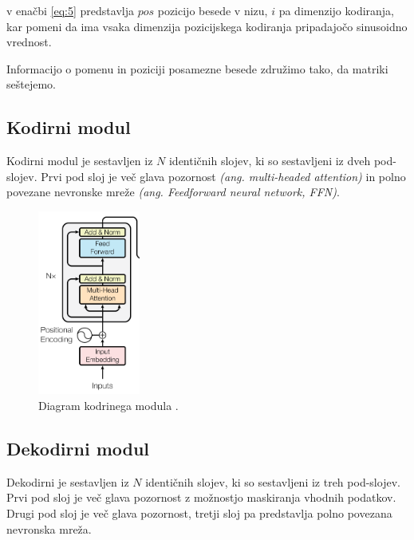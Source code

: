 \documentclass[a4paper,12pt,openright]{book}
\begin{document}
v enačbi \ref{eq:5} predstavlja $ pos $ pozicijo besede v nizu, $ i $ pa dimenzijo kodiranja, kar pomeni da ima vsaka dimenzija pozicijskega kodiranja pripadajočo sinusoidno vrednost.


Informacijo o pomenu in poziciji posamezne besede združimo tako, da matriki seštejemo.

\subsection{Kodirni modul}
Kodirni modul je sestavljen iz $ N $ identičnih slojev, ki so sestavljeni iz dveh pod-slojev. Prvi pod sloj je več glava pozornost \emph{(ang. multi-headed attention)} in polno povezane nevronske mreže \emph{(ang. Feedforward neural network, FFN)}.

\begin{figure}[htb]
    \begin{center}
        \includegraphics[width=0.3\textwidth]{img/encoder.png}
    \end{center}
    \caption{Diagram kodrinega modula \cite{attention_is_all_you_need}.}
    \label{img:encoder}
\end{figure}


\subsection{Dekodirni modul}
Dekodirni je sestavljen iz $ N $ identičnih slojev, ki so sestavljeni iz treh pod-slojev. Prvi pod sloj je več glava pozornost z možnostjo maskiranja vhodnih podatkov. Drugi pod sloj je več glava pozornost, tretji sloj pa predstavlja polno povezana nevronska mreža.
\end{document}
